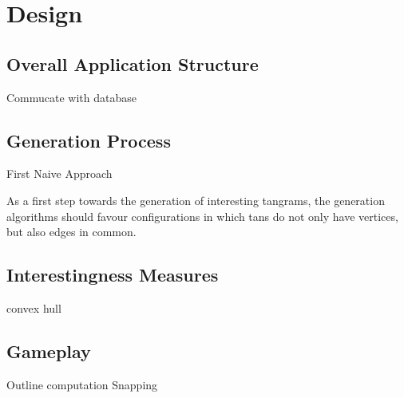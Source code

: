 \chapter{Design}\label{chapter:design}

\section{Overall Application Structure}

Commucate with database

\section{Generation Process}

First Naive Approach

As a first step towards the generation of interesting tangrams, the generation algorithms should favour configurations in which tans do not only have vertices, but also edges in common. 

\section{Interestingness Measures}
convex hull

\section{Gameplay}
Outline computation
Snapping
